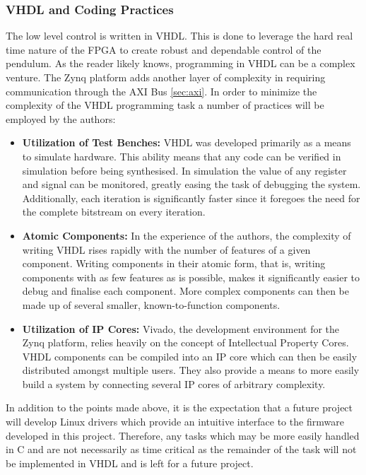\subsubsection{VHDL and Coding Practices} %
\label{ssub:vhdl_and_coding_practices}
The low level control is written in VHDL.
This is done to leverage the hard real time nature of the FPGA to create robust and dependable control of the pendulum.
As the reader likely knows, programming in VHDL can be a complex venture.
The Zynq platform adds another layer of complexity in requiring communication through the AXI Bus \ref{sec:axi}.
In order to minimize the complexity of the VHDL programming task a number of practices will be employed by the authors:
\begin{itemize}
	\item \textbf{Utilization of Test Benches:} VHDL was developed primarily as a means to simulate hardware.
	This ability means that any code can be verified in simulation before being synthesised.
	In simulation the value of any register and signal can be monitored, greatly easing the task of debugging the system.
	Additionally, each iteration is significantly faster since it foregoes the need for the complete bitstream on every iteration.
	\item \textbf{Atomic Components:} In the experience of the authors, the complexity of writing VHDL rises rapidly with the number of features of a given component.
	Writing components in their atomic form, that is, writing components with as few features as is possible, makes it significantly easier to debug and finalise each component.
	More complex components can then be made up of several smaller, known-to-function components.
	\item \textbf{Utilization of IP Cores:} Vivado, the development environment for the Zynq platform, relies heavily on the concept of Intellectual Property Cores.
	VHDL components can be compiled into an IP core which can then be easily distributed amongst multiple users.
	They also provide a means to more easily build a system by connecting several IP cores of arbitrary complexity.
\end{itemize}
In addition to the points made above, it is the expectation that a future project will develop Linux drivers which provide an intuitive interface to the firmware developed in this project.
Therefore, any tasks which may be more easily handled in C and are not necessarily as time critical as the remainder of the task will not be implemented in VHDL and is left for a future project.



